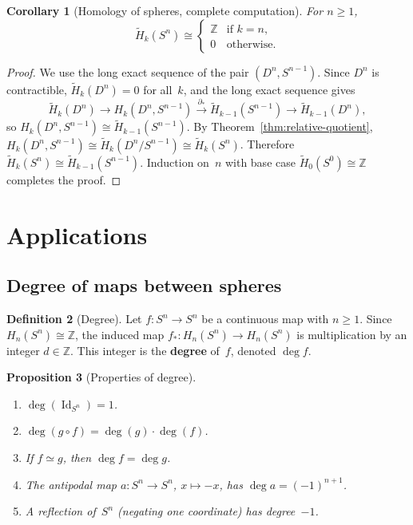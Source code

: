 \documentclass[12pt,a4paper,openany]{book}
\theoremstyle{definition}
\newtheorem{definition}{Definition}[chapter]
\theoremstyle{plain}
\newtheorem{proposition}[definition]{Proposition}
\newtheorem{corollary}[definition]{Corollary}
\theoremstyle{remark}
\newcommand{\Z}{\mathbb{Z}}
\DeclareMathOperator{\Id}{Id}
\begin{document}
\begin{corollary}[Homology of spheres, complete computation]\label{cor:homology-spheres-computed}
For $n\ge 1$,
\[
  \widetilde{H}_k(S^n)
  \cong
  \begin{cases}
    \Z & \text{if } k=n,\\
    0 & \text{otherwise}.
  \end{cases}
\]
\end{corollary}

\begin{proof}
We use the long exact sequence of the pair $(D^n,S^{n-1})$.  Since
$D^n$ is contractible, $\widetilde{H}_k(D^n)=0$ for all~$k$, and
the long exact sequence gives
\[
  \widetilde{H}_k(D^n)\to H_k(D^n,S^{n-1})\xrightarrow{\partial_*}
  \widetilde{H}_{k-1}(S^{n-1})\to\widetilde{H}_{k-1}(D^n),
\]
so $H_k(D^n,S^{n-1})\cong\widetilde{H}_{k-1}(S^{n-1})$.
By Theorem~\ref{thm:relative-quotient}, $H_k(D^n,S^{n-1})\cong
\widetilde{H}_k(D^n/S^{n-1})\cong\widetilde{H}_k(S^n)$.
Therefore $\widetilde{H}_k(S^n)\cong\widetilde{H}_{k-1}(S^{n-1})$.
Induction on~$n$ with base case $\widetilde{H}_0(S^0)\cong\Z$
completes the proof.
\end{proof}

\section{Applications}\label{sec:applications-homology}

\subsection{Degree of maps between spheres}\label{subsec:degree}

\begin{definition}[Degree]\label{def:degree}
Let $f\colon S^n\to S^n$ be a continuous map with $n\ge 1$.  Since
$H_n(S^n)\cong\Z$, the induced map
$f_*\colon H_n(S^n)\to H_n(S^n)$
is multiplication by an integer $d\in\Z$.  This integer is the
\textbf{degree} of~$f$, denoted $\deg f$.
\end{definition}

\begin{proposition}[Properties of degree]\label{prop:degree-properties}
\begin{enumerate}[label=\textup{(\roman*)},leftmargin=2.5em]
  \item $\deg(\Id_{S^n})=1$.
  \item $\deg(g\circ f)=\deg(g)\cdot\deg(f)$.
  \item If $f\simeq g$, then $\deg f=\deg g$.
  \item The antipodal map $a\colon S^n\to S^n$, $x\mapsto -x$, has
    $\deg a=(-1)^{n+1}$.
  \item A reflection of~$S^n$ (negating one coordinate) has degree~$-1$.
\end{enumerate}
\end{proposition}
\end{document}
